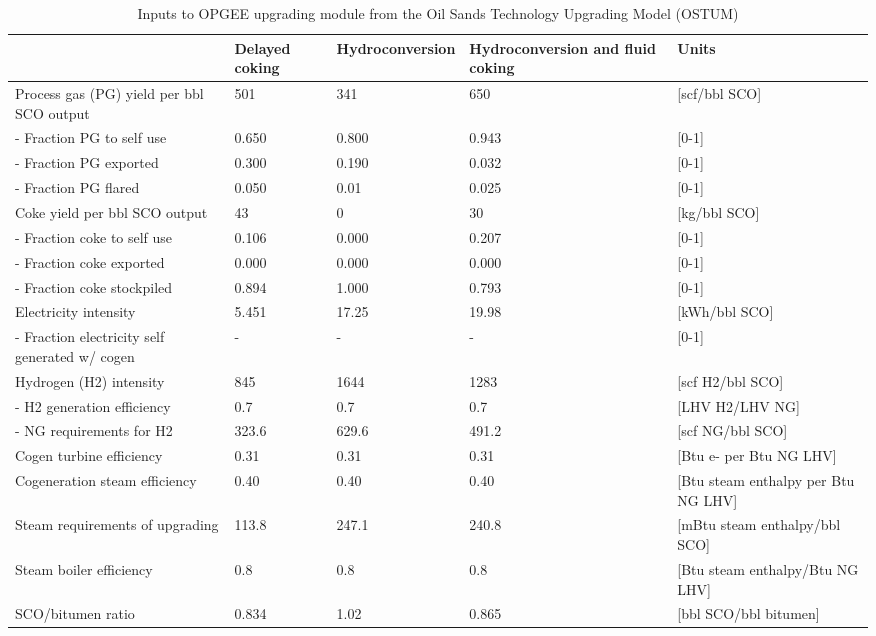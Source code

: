 \documentclass[11pt]{report}
\begin{document}
\begin{landscape}
\begin{table}
\caption{Inputs to OPGEE upgrading module from the Oil Sands Technology Upgrading Model (OSTUM)}
\label{tab:upgrading_data}
\begin{scriptsize}
\begin{tabularx}{1\columnwidth}{p{}p{}p{}p{}p{}}
\toprule
							&Delayed coking     & Hydroconversion & Hydroconversion and fluid coking &      Units \\ 
\midrule
Process gas (PG) yield per bbl SCO output       & 501   	& 341   & 650   		& [scf/bbl SCO]   \\
\quad - Fraction PG to self use  	& 0.650 	& 0.800& 0.943 		& {[}0-1{]}     \\
\quad - Fraction PG exported     	& 0.300 	& 0.190& 0.032 		& {[}0-1{]}     \\
\quad - Fraction PG flared       	& 0.050 	& 0.01  & 0.025 		& {[}0-1{]}     \\
Coke yield per bbl SCO output        		& 43   	& 0       & 30  			& [kg/bbl SCO]    \\
\quad - Fraction coke to self use	& 0.106 	& 0.000& 0.207 		& {[}0-1{]}     \\
\quad - Fraction coke exported   	& 0.000 	& 0.000& 0.000 		& {[}0-1{]}     \\
\quad - Fraction coke stockpiled 	& 0.894 	& 1.000& 0.793 		& {[}0-1{]}     \\
Electricity intensity      			& 5.451 	& 17.25& 19.98 		& [kWh/bbl SCO]   \\
\quad - Fraction electricity self generated w/ cogen 	& -     	& -        & -     		& {[}0-1{]}     \\
Hydrogen (H2) intensity    		& 845   	& 1644 & 1283   		& [scf H2/bbl SCO]\\
\quad- H2 generation efficiency 	& 0.7   	& 0.7    & 0.7   		& [LHV H2/LHV NG]     \\
\quad- NG requirements for H2   	& 323.6 	& 629.6& 491.2 		& [scf NG/bbl SCO]         \\
Cogen turbine efficiency   		& 0.31  	& 0.31  & 0.31  		& [Btu e- per Btu NG LHV]   \\
Cogeneration steam efficiency       		& 0.40  	& 0.40  & 0.40  		& [Btu steam enthalpy per Btu NG LHV] \\
Steam requirements of upgrading      	& 113.8 	& 247.1& 240.8 		& [mBtu steam enthalpy/bbl SCO]       \\
Steam boiler efficiency    		& 0.8   	& 0.8    & 0.8   		& [Btu steam enthalpy/Btu NG LHV]     \\
SCO/bitumen ratio		& 0.834         	& 1.02  & 0.865 		& [bbl SCO/bbl bitumen]     \\ 
\bottomrule
\end{tabularx}
\end{scriptsize}
\end{table}
\end{landscape}
\end{document}
